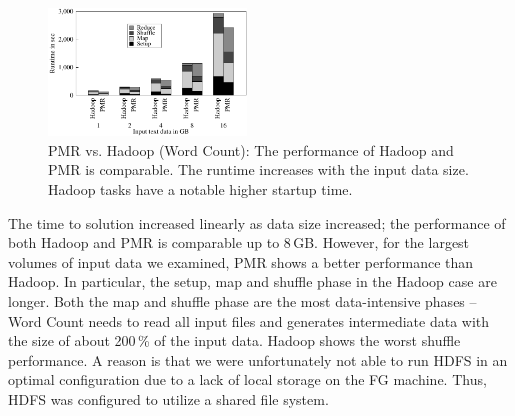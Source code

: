 \documentclass{acm_proc_article-sp}
\newcommand{\jhanote}[1]{ {\textcolor{red} { ***SJ: #1 }}}
\newcommand{\alnote}[1]{ {\textcolor{blue} { ***andreL: #1 }}}
\newcommand{\pnote}[1]{ {\textcolor{magenta} { ***pradeep: #1 }}}
\newcommand{\alnote}[1]{}
\newcommand{\pnote}[1]{}
\newcommand{\jhanote}[1]{}
\newcommand{\upp}{\vspace*{-0.5em}}
\begin{document}
\begin{figure}[ht]
	\centering
		\includegraphics[width=0.47\textwidth]{figures/wc_pmr_hmr.pdf}
                \caption{PMR vs. Hadoop (Word Count): The performance
                  of Hadoop and PMR is comparable. The runtime 
                  increases with the input data size. Hadoop tasks
                  have a notable higher startup time.\upp}
\label{fig:figures_wc_pmr_hmr}
\end{figure}		
	
The time to solution increased linearly as data size increased; the performance
of both Hadoop and PMR is comparable up to 8\,GB. However, for the largest
volumes of input data we examined, PMR shows a better performance than Hadoop.
In particular, the setup, map and shuffle phase in the Hadoop case are longer.
Both the map and shuffle phase are the most data-intensive phases -- Word Count
needs to read all input files and generates intermediate data with the size of
about 200\,\% of the input data. Hadoop shows the worst shuffle performance. A
reason is that we were unfortunately not able to run HDFS in an optimal
configuration due to a lack of local storage on the FG machine. Thus, HDFS was
configured to utilize a shared file system.
  


\end{document}
